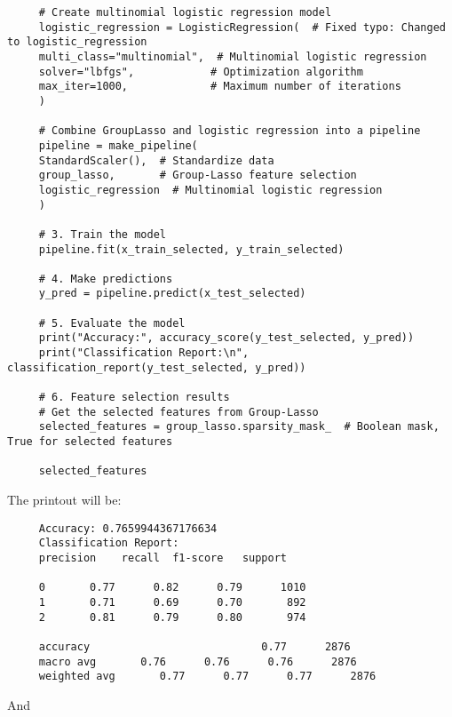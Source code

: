 \documentclass[letterpaper]{article}
\begin{document}
\begin{lstlisting}
     # Create multinomial logistic regression model
     logistic_regression = LogisticRegression(  # Fixed typo: Changed to logistic_regression
     multi_class="multinomial",  # Multinomial logistic regression
     solver="lbfgs",            # Optimization algorithm
     max_iter=1000,             # Maximum number of iterations
     )
     
     # Combine GroupLasso and logistic regression into a pipeline
     pipeline = make_pipeline(
     StandardScaler(),  # Standardize data
     group_lasso,       # Group-Lasso feature selection
     logistic_regression  # Multinomial logistic regression
     )
     
     # 3. Train the model
     pipeline.fit(x_train_selected, y_train_selected)
     
     # 4. Make predictions
     y_pred = pipeline.predict(x_test_selected)
     
     # 5. Evaluate the model
     print("Accuracy:", accuracy_score(y_test_selected, y_pred))
     print("Classification Report:\n", classification_report(y_test_selected, y_pred))
     
     # 6. Feature selection results
     # Get the selected features from Group-Lasso
     selected_features = group_lasso.sparsity_mask_  # Boolean mask, True for selected features
     
     selected_features
\end{lstlisting}

The printout will be:

\begin{minipage}{\linewidth}
	\begin{Verbatim}
     Accuracy: 0.7659944367176634
     Classification Report:
     precision    recall  f1-score   support
     
     0       0.77      0.82      0.79      1010
     1       0.71      0.69      0.70       892
     2       0.81      0.79      0.80       974
     
     accuracy                           0.77      2876
     macro avg       0.76      0.76      0.76      2876
     weighted avg       0.77      0.77      0.77      2876
	\end{Verbatim}
\end{minipage}

And 
\end{document}
